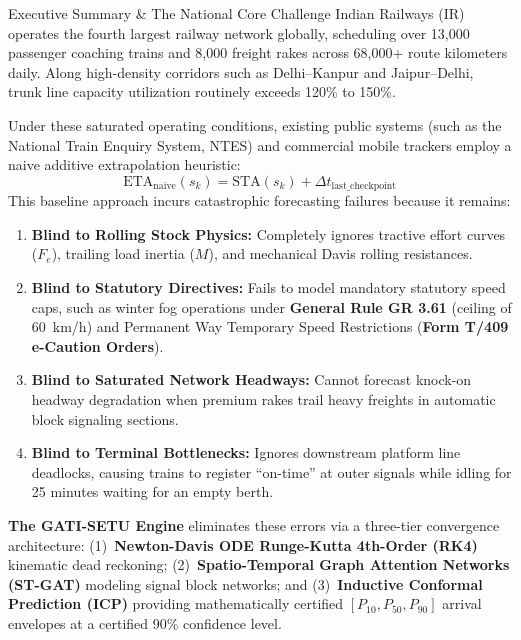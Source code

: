 \documentclass[10pt, a4paper]{article}
\begin{document}
\begin{jurybox}{Executive Summary \& The National Core Challenge}
  Indian Railways (IR) operates the fourth largest railway network globally, scheduling over 13,000 passenger coaching trains and 8,000 freight rakes across 68,000+ route kilometers daily. Along high-density corridors such as Delhi--Kanpur and Jaipur--Delhi, trunk line capacity utilization routinely exceeds 120\% to 150\%.

  Under these saturated operating conditions, existing public systems (such as the National Train Enquiry System, NTES) and commercial mobile trackers employ a naive additive extrapolation heuristic:
  \begin{equation}
    \text{ETA}_{\text{naive}}(s_k) = \text{STA}(s_k) + \Delta t_{\text{last\_checkpoint}}
  \end{equation}
  This baseline approach incurs catastrophic forecasting failures because it remains:
  \begin{enumerate}[leftmargin=5mm, itemsep=1pt]
    \item \textbf{Blind to Rolling Stock Physics:} Completely ignores tractive effort curves ($F_e$), trailing load inertia ($M$), and mechanical Davis rolling resistances.
    \item \textbf{Blind to Statutory Directives:} Fails to model mandatory statutory speed caps, such as winter fog operations under \textbf{General Rule GR 3.61} (ceiling of 60~km/h) and Permanent Way Temporary Speed Restrictions (\textbf{Form T/409 e-Caution Orders}).
    \item \textbf{Blind to Saturated Network Headways:} Cannot forecast knock-on headway degradation when premium rakes trail heavy freights in automatic block signaling sections.
    \item \textbf{Blind to Terminal Bottlenecks:} Ignores downstream platform line deadlocks, causing trains to register ``on-time'' at outer signals while idling for 25 minutes waiting for an empty berth.
  \end{enumerate}

  \textbf{The GATI-SETU Engine} eliminates these errors via a three-tier convergence architecture: (1)~\textbf{Newton-Davis ODE Runge-Kutta 4th-Order (RK4)} kinematic dead reckoning; (2)~\textbf{Spatio-Temporal Graph Attention Networks (ST-GAT)} modeling signal block networks; and (3)~\textbf{Inductive Conformal Prediction (ICP)} providing mathematically certified $[P_{10}, P_{50}, P_{90}]$ arrival envelopes at a certified 90\% confidence level.
\end{jurybox}
\end{document}
